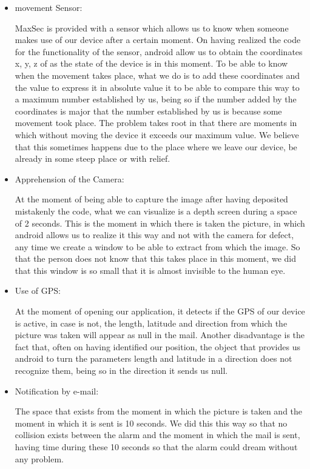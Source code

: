 \documentclass[12pt,letterpaper]{article}
\begin{document}
  
   \begin{itemize}
   \item movement Sensor:
   
   MaxSec is provided with a sensor which allows us to know when someone makes use of our device after a certain moment. On having realized the code for the functionality of the sensor, android allow us to obtain the coordinates x, y, z of as the state of the device is in this moment. To be able to know when the movement takes place, what we do is to add these coordinates and the value to express it in absolute value it to be able to compare this way to a maximum number established by us, being so if the number added by the coordinates is major that the number established by us is because some movement took place. The problem takes root in that there are moments in which without moving the device it exceeds our maximum value.
   We believe that this sometimes happens due to the place where we leave our device, be already in some steep place or with relief.
   
   \item Apprehension of the Camera:
   
   At the moment of being able to capture the image after having deposited mistakenly the code, what we can visualize is a depth screen during a space of 2 seconds. This is the moment in which there is taken the picture, in which android allows us to realize it this way and not with the camera for defect, any time we create a window to be able to extract from which the image. So that the person does not know that this takes place in this moment, we did that this window is so small that it is almost invisible to the human eye.
   
   \item Use of GPS:
   
  At the moment of opening our application, it detects if the GPS of our device is active, in case is not, the length, latitude and direction from which the picture was taken will appear as null in the mail.
  Another disadvantage is the fact that, often on having identified our position, the object that provides us android to turn the parameters length and latitude in a direction does not recognize them, being so in the direction it sends us null.
   
   \item Notification by e-mail:

  The space that exists from the moment in which the picture is taken and the moment in which it is sent is 10 seconds. We did this this way so that no collision exists between the alarm and the moment in which the mail is sent, having time during these 10 seconds so that the alarm could dream without any problem.
   \end{itemize}
   
\end{document}
